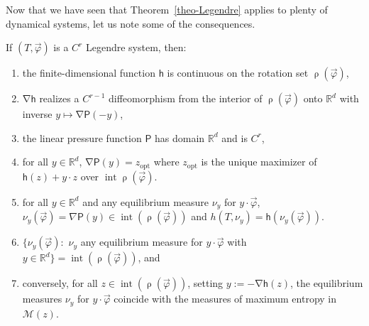 \documentclass[AHL, Unicode, longabstracts,published]{cedram}
\theoremstyle{plain}
\theoremstyle{plain}
\newcommand\vpot{\vec\pot}
\DeclareMathOperator{\interior}{int}
\newcommand{\rs}{\operatorname{\rho}}
\newcommand{\grad}{\operatorname{\nabla}}
\newcommand{\opt}{\mathrm{opt}}
\newcommand{\hf}{\mathsf{h}}
\newcommand{\Pf}{\mathsf{P}}
\newcommand{\pot}{\varphi}
\newcommand*\8{\infty}
\newcommand\RR{\mathbb{R}}
\newcommand{\cM}{\mathcal{M}}
\begin{document}
Now that we have seen that Theorem~\ref{theo-Legendre} applies to plenty of dynamical systems, let us note some of the consequences.


\break
\begin{prop}\label{prop:nlem}
If $(T,\vpot)$ is a $C^r$ Legendre system, then:
\begin{enumerate}
\item the finite-dimensional function $\hf$ is continuous on the rotation set $\rs(\vpot)$,
\item $\grad \hf$ realizes a $C^{r-1}$ diffeomorphism from the interior of $\rs(\vpot)$ onto $\RR^d$ with inverse $ y\mapsto\grad \Pf(- y)$,
\item the linear pressure function $\Pf$ has domain $\RR^d$ and is $C^r$,
\item for all $ y\in\RR^d$, $\grad \Pf(y) = z_{\opt}$ where $ z_{\opt}$ is the unique maximizer of $\hf(z)+ y\cdot z$ over $\interior\rs(\vpot)$.
\item\label{eq-int-ent}
for all $y\in\RR^d$ and any equilibrium measure $\nu_y$ for $y\cdot\vec\pot$, $\nu_{ y}(\vpot)=\nabla\Pf(y)\in\interior(\rs(\vpot))$ and $h(T,\nu_{ y})=\hf(\nu_{ y}(\vpot))$.
\item\label{eq-eq-values}
$\{\nu_{ y}(\vpot):$ $\nu_y$ any equilibrium measure for $y\cdot\vec\pot$ with $y\in\RR^d\} = \interior(\rs(\vpot))$, and
\item\label{eq-rev}
conversely, for all $ z\in\interior(\rs(\vpot))$, setting $y:=-\grad \hf(z)$, the equilibrium measures $\nu_y$ for $y\cdot\vec\pot$ coincide with the measures of maximum entropy in $\cM(z)$.
\end{enumerate}
\end{prop}
\end{document}
